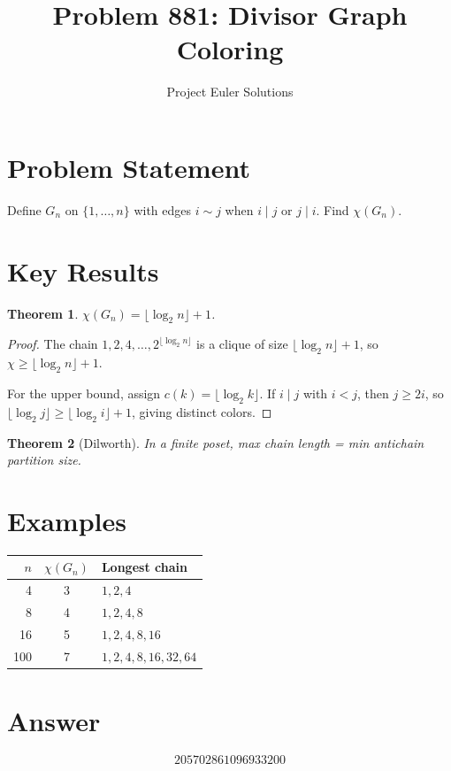 \documentclass[11pt]{article}
\title{Problem 881: Divisor Graph Coloring}
\author{Project Euler Solutions}
\date{}
\newtheorem{theorem}{Theorem}
\begin{document}
\maketitle

\section{Problem Statement}
Define $G_n$ on $\{1,\ldots,n\}$ with edges $i \sim j$ when $i \mid j$ or $j \mid i$. Find $\chi(G_n)$.

\section{Key Results}

\begin{theorem}
$\chi(G_n) = \lfloor \log_2 n \rfloor + 1$.
\end{theorem}

\begin{proof}
The chain $1, 2, 4, \ldots, 2^{\lfloor\log_2 n\rfloor}$ is a clique of size $\lfloor\log_2 n\rfloor + 1$, so $\chi \ge \lfloor\log_2 n\rfloor + 1$.

For the upper bound, assign $c(k) = \lfloor\log_2 k\rfloor$. If $i \mid j$ with $i < j$, then $j \ge 2i$, so $\lfloor\log_2 j\rfloor \ge \lfloor\log_2 i\rfloor + 1$, giving distinct colors.
\end{proof}

\begin{theorem}[Dilworth]
In a finite poset, max chain length = min antichain partition size.
\end{theorem}

\section{Examples}
\begin{center}
\begin{tabular}{r|c|l}
$n$ & $\chi(G_n)$ & Longest chain \\ \hline
4 & 3 & $1,2,4$ \\
8 & 4 & $1,2,4,8$ \\
16 & 5 & $1,2,4,8,16$ \\
100 & 7 & $1,2,4,8,16,32,64$
\end{tabular}
\end{center}

\section{Answer}

\[
\boxed{205702861096933200}
\]
\end{document}
